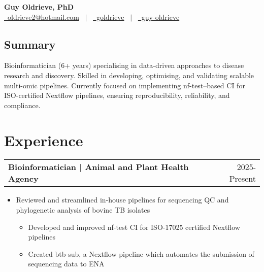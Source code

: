 \documentclass[a4paper,11pt]{article}
\makeatletter
\newenvironment{joblong}[2]{
  \begin{tabularx}{\linewidth}{@{}l X r@{}}
  \textbf{#1} & & #2 \\[2pt]
  \end{tabularx}
  \begin{itemize}[leftmargin=1.2em, itemsep=3pt, label=-]
}{
  \end{itemize}
}
\makeatother
\begin{document}
\pagestyle{empty}


\begin{center}
    {\Huge \textbf{Guy Oldrieve, PhD}} \\[6pt]
    \href{mailto:oldrieve2@hotmail.com}{\faEnvelope\ oldrieve2@hotmail.com}  \ $|$ \ 
    \href{https://github.com/goldrieve}{\faGithub\ goldrieve}  \ $|$ \ 
    \href{https://linkedin.com/in/guy-oldrieve}{\faLinkedin\ guy-oldrieve}
    \end{center}

\begin{multicols}{2}
\subsection*{Summary}
\item Bioinformatician (6+ years) specialising in data-driven approaches to disease research and discovery. Skilled in developing, optimising, and validating scalable multi-omic pipelines. Currently focused on implementing nf-test–based CI for ISO-certified Nextflow pipelines, ensuring reproducibility, reliability, and compliance.

\columnbreak

\subsection*{}
\item {}       
\end{multicols}

\section{Experience}

\begin{joblong}{Bioinformatician | Animal and Plant Health Agency}{2025-Present}
\item Reviewed and streamlined in-house pipelines for sequencing QC and phylogenetic analysis of bovine TB isolates
  \begin{itemize}[leftmargin=2em, itemsep=2pt, label=$\circ$]
    \item Developed and improved nf-test CI for ISO-17025 certified Nextflow pipelines
    \item Created btb-sub, a Nextflow pipeline which automates the submission of sequencing data to ENA
  \end{itemize}
\end{joblong}
\end{document}
